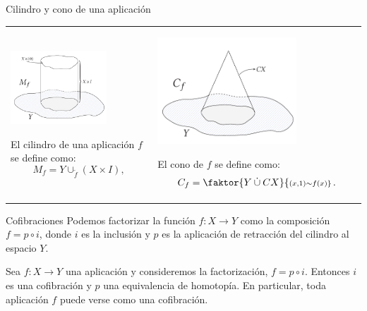 \begin{frame}{Cilindro y cono de una aplicación}
\begin{tabular}{ll}
\begin{minipage}{0.5\textwidth}
\centering
\includegraphics[width = 0.7\textwidth]{images/cilindrof}
\par
El cilindro de una aplicación $f$ se define como:
\[M_f = Y \cup_{\tilde{f}} (X \times I), \] 
\end{minipage}
& \pause
\begin{minipage}{0.5\textwidth}
\centering
\includegraphics[width = 0.7\textwidth]{images/conof}
\par
El cono de $f$ se define como:
\[ C_f = \faktor{Y \: \dot{\cup} \: CX}{\scriptstyle (x,1) \sim f(x)} \, . \]
\end{minipage}
\end{tabular}
\end{frame}

\begin{frame}{Cofibraciones}
Podemos factorizar la función $f :  X \longrightarrow Y$ como la composición $f = p \circ i$, donde $i$ es la inclusión y $p$ es la aplicación de retracción del cilindro al espacio $Y$.
\pause
\begin{teor}
Sea $f : X \longrightarrow Y$ una aplicación y consideremos la factorización, $f = p \circ i$. Entonces $i$ es una cofibración y $p$ una equivalencia de homotopía. En particular, toda aplicación $f$ puede verse como una cofibración. 
\end{teor}
\end{frame}

